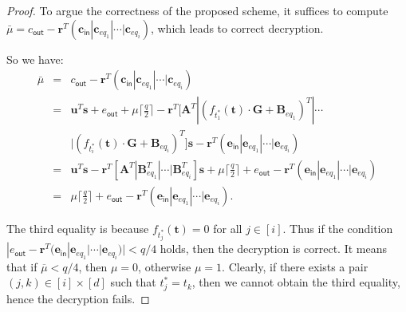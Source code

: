 \documentclass[runningheads,10pt]{llncs}
\begin{document}
\iffalse
\begin{proof}
To argue the correctness of the proposed scheme, 
	it suffices to compute $\bar{\mu}= c_{\textsf{out}}-\textbf{r}^T(\textbf{c}_\textsf{in}|\textbf{c}_{eq_{1}}|\cdots|\textbf{c}_{eq_{i}})$,
	which leads to correct decryption.
	\iffalse 
	Recall that,
	\begin{itemize}
		
		\item If $\textbf{B}_{eq_j} \leftarrow \textsf{Eval}_\textsf{pk}(f_{t^*_{j}}, (\textbf{B}_k)_{k=1}^d)$, and $\textbf{c}_{eq_j}\leftarrow \textsf{Eval}_\textsf{ct}(f_{t^*_{j}},  ((t_k, \textbf{B}_k,\textbf{c}_{k}))_{k=1}^{d})$, 
		then $\textbf{c}_{eq_j}=(f_{t^*_{j}}(t_1,\cdots,t_d)\textbf{G}+\textbf{B}_{eq_j})^T \textbf{s}+\textbf{e}_{{eq_j}}$.
		\item For all $j \in [i]$, $f_{t^*_j}(\textbf{t})=0$  iff $t^*_1,\cdots, t^*_i \in \mathcal{T} \setminus \{t_1, \cdots, t_d\}$. 
	\end{itemize}
	
	\fi 
	So we have:
	\begin{eqnarray*}
		\bar{\mu}&=& c_{\textsf{out}}-\textbf{r}^T(\textbf{c}_\textsf{in}|\textbf{c}_{eq_{1}}|\cdots|\textbf{c}_{eq_{i}})\\
		&=& \textbf{u}^T \textbf{s}+e_{\textsf{out}}+\mu \lceil \frac{q}{2} \rceil-\textbf{r}^T[\textbf{A}^T|(f_{t^*_1}(\textbf{t})\cdot\textbf{G}+\textbf{B}_{eq_1})^T|\cdots \\
		&& |(f_{t^*_i}(\textbf{t})\cdot \textbf{G}+\textbf{B}_{eq_i})^T]\textbf{s} -\textbf{r}^T(\textbf{e}_{\textsf{in}}|\textbf{e}_{eq_1}|\cdots|\textbf{e}_{eq_i})\\
		&=&\textbf{u}^T \textbf{s}-\textbf{r}^T[\textbf{A}^T|\textbf{B}_{eq_1}^T|\cdots|\textbf{B}_{eq_i}^T]\textbf{s}+\mu \lceil \frac{q}{2}\rceil +e_{\textsf{out}}-\textbf{r}^T(\textbf{e}_{\textsf{in}}|\textbf{e}_{eq_1}|\cdots|\textbf{e}_{eq_i})\\
		&=& \mu \lceil \frac{q}{2} \rceil+ e_{\textsf{out}} -\textbf{r}^T(\textbf{e}_{\textsf{in}}|\textbf{e}_{eq_1}|\cdots|\textbf{e}_{eq_i}).
	\end{eqnarray*}
	\iffalse
	Next, we evaluate the length of $|e_{\textsf{out}} -\textbf{r}^T(\textbf{e}_{\textsf{in}}|\textbf{e}_{eq_1}|\cdots|\textbf{e}_{eq_i})|$. We have,
	
	\begin{itemize}
		\item  $e_{\textsf{out}} \leftarrow \mathcal{D}_{\mathbb{Z}_q,\sigma_1}$, $\textbf{e}_\textsf{in} \leftarrow \mathcal{D}_{\mathbb{Z}_q^{m},\sigma_1}$: $|e_{\textsf{out}}|<\sigma_1$
	\end{itemize}
	\fi
	The third equality is because  $f_{t^*_j}(\textbf{t})=0$  for all $j \in [i]$. Thus if the condition $|e_{\textsf{out}} -\textbf{r}^T(\textbf{e}_{\textsf{in}}|\textbf{e}_{eq_1}|\cdots|\textbf{e}_{eq_i})|<q/4$ holds,
	then the decryption is correct.
	It means that if $\overline{\mu} < q/4$, then $\mu=0$, otherwise $\mu=1$.
	Clearly,  if there exists a pair $(j,k) \in [i]\times [d]$ such that $t^*_j =t_k$, then we cannot obtain the third equality, hence the decryption fails.
\end{proof}
\end{document}
